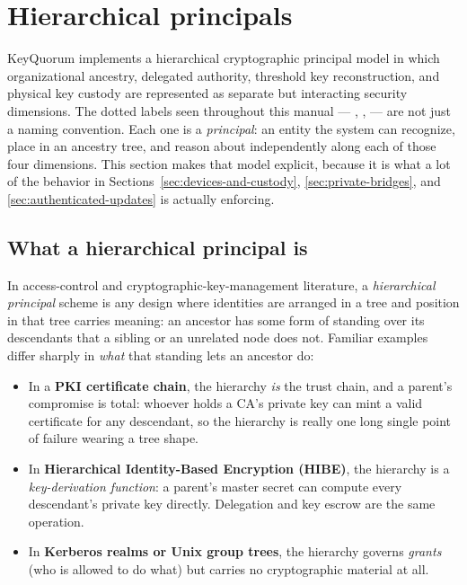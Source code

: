 \section{Hierarchical principals}
\label{sec:hierarchical-principals}

KeyQuorum implements a hierarchical cryptographic principal model in which
organizational ancestry, delegated authority, threshold key reconstruction,
and physical key custody are represented as separate but interacting
security dimensions. The dotted labels seen throughout this manual ---
, ,  --- are not just a naming convention.
Each one is a \emph{principal}: an entity the system can recognize, place
in an ancestry tree, and reason about independently along each of those
four dimensions. This section makes that model explicit, because it is
what a lot of the behavior in Sections~\ref{sec:devices-and-custody},
\ref{sec:private-bridges}, and \ref{sec:authenticated-updates} is actually
enforcing.

\subsection{What a hierarchical principal is}

In access-control and cryptographic-key-management literature, a
\emph{hierarchical principal} scheme is any design where identities are
arranged in a tree and position in that tree carries meaning: an ancestor
has some form of standing over its descendants that a sibling or an
unrelated node does not. Familiar examples differ sharply in \emph{what}
that standing lets an ancestor do:

\begin{itemize}
  \item In a \textbf{PKI certificate chain}, the hierarchy \emph{is} the
  trust chain, and a parent's compromise is total: whoever holds a CA's
  private key can mint a valid certificate for any descendant, so the
  hierarchy is really one long single point of failure wearing a tree
  shape.
  \item In \textbf{Hierarchical Identity-Based Encryption (HIBE)}, the
  hierarchy is a \emph{key-derivation function}: a parent's master secret
  can compute every descendant's private key directly. Delegation and key
  escrow are the same operation.
  \item In \textbf{Kerberos realms or Unix group trees}, the hierarchy
  governs \emph{grants} (who is allowed to do what) but carries no
  cryptographic material at all.
\end{itemize}

